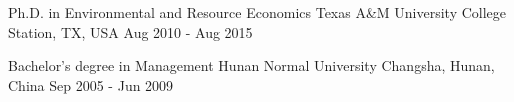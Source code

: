 

\begin{cventries}
    \cventry
    {Ph.D. in Environmental and Resource Economics}
    {Texas A\&M University}
    {College Station, TX, USA}
    {Aug 2010 - Aug 2015}
    {}
    \vspace{-5mm}

    \cventry
    {Bachelor's degree in Management}
    {Hunan Normal University}
    {Changsha, Hunan, China}
    {Sep 2005 - Jun 2009}
    {}
    \vspace{-5mm}
\end{cventries}

